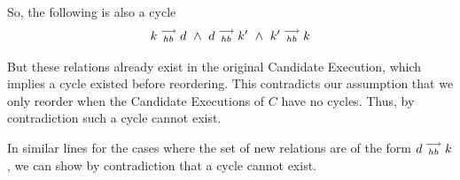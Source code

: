     So, the following is also a cycle
    \[
        k\stackrel{\longrightarrow}{_{hb}}d \ \wedge \
        d\stackrel{\longrightarrow}{_{hb}}k' \ \wedge \
        k'\stackrel{\longrightarrow}{_{hb}}k
    \]

    But these relations already exist in the original Candidate Execution, which implies a cycle existed before reordering. This contradicts our assumption that we only reorder when the Candidate Executions of $C$ have no cycles. Thus, by contradiction such a cycle cannot exist.

    In similar lines for the cases where the set of new relations are of the form $d\stackrel{\longrightarrow}{_{hb}}k$, we can show by contradiction that a cycle cannot exist.
